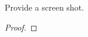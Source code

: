 \documentclass[../../main.tex]{subfiles}
\begin{document}
\begin{wts}
Provide a screen shot. 
\end{wts}
\begin{proof}

\end{proof}
\end{document}
